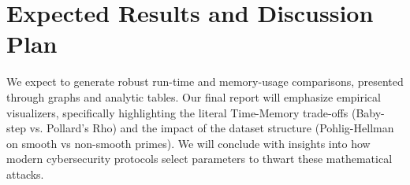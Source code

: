 \documentclass[12pt, a4paper]{article}
\begin{document}
\section{Expected Results and Discussion Plan}
We expect to generate robust run-time and memory-usage comparisons, presented through graphs and analytic tables. Our final report will emphasize empirical visualizers, specifically highlighting the literal Time-Memory trade-offs (Baby-step vs. Pollard's Rho) and the impact of the dataset structure (Pohlig-Hellman on smooth vs non-smooth primes). We will conclude with insights into how modern cybersecurity protocols select parameters to thwart these mathematical attacks.
\end{document}
